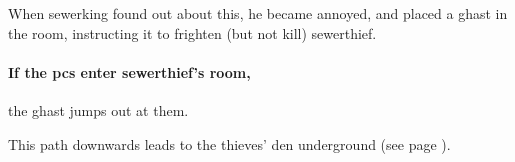 \showTalisman

When \gls{sewerking} found out about this, he became annoyed, and placed a ghast in the room, instructing it to frighten (but not kill) \gls{sewerthief}.

\paragraph{If the \glspl{pc} enter \gls{sewerthief}'s room,}
the ghast jumps out at them.

\ghast

This path downwards leads to the thieves' den underground (see page \pageref{sewerPigWalk}).

